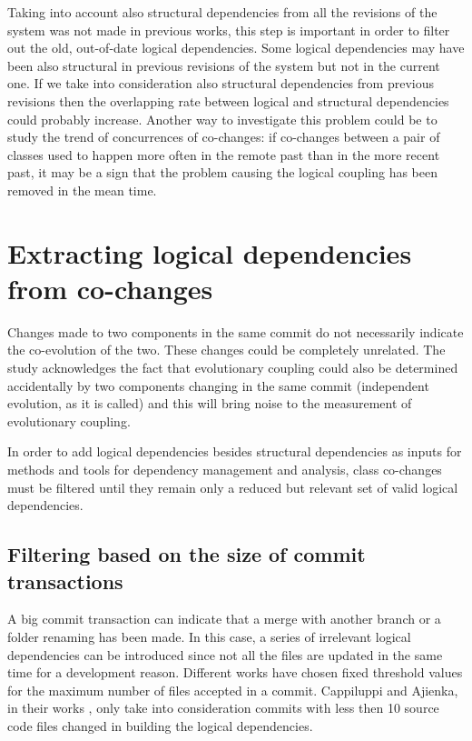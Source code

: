 \documentclass[12pt]{mitthesis}
\begin{document}
Taking into account also structural dependencies from all the revisions of the system was not made in previous works, this step is important in order to filter out the old, out-of-date logical dependencies. Some logical dependencies may have been also structural in previous revisions of the system but not in the current one. If we take into consideration also structural dependencies from previous revisions then the overlapping rate between logical and structural dependencies could probably increase. Another way to investigate this problem could be to study the trend of concurrences of co-changes: if co-changes between a pair of classes used to happen more often in the remote past than in the more recent past, it may be a sign that the problem causing the logical coupling has been removed in the mean time. 



\section{Extracting logical dependencies from co-changes}

Changes made to two components in the same commit do not necessarily indicate the co-evolution of the two. These changes could be completely unrelated. The study \cite{Yu2007} acknowledges the fact that evolutionary coupling could also be determined accidentally by two components changing in the same commit (independent evolution, as it is called) and this will bring noise to the measurement of evolutionary coupling. 

In order to add logical dependencies besides structural dependencies as inputs for methods and tools for dependency management and analysis, class co-changes must be filtered until they remain only a reduced but relevant set of valid logical dependencies. 

\subsection{Filtering based on the size of commit transactions}

A big commit transaction can indicate that a merge with another branch or a folder renaming has been made.
In this case, a series of irrelevant logical dependencies can be introduced since not all the files are updated in the same time for a development reason. Different works have chosen fixed threshold values for the maximum number of files accepted in a commit. Cappiluppi and Ajienka, in their works \cite{DBLP:journals/jss/AjienkaC17}, \cite{DBLP:journals/ese/AjienkaCC18} only take into consideration commits with less then 10 source code files changed in building the logical dependencies.
\end{document}

